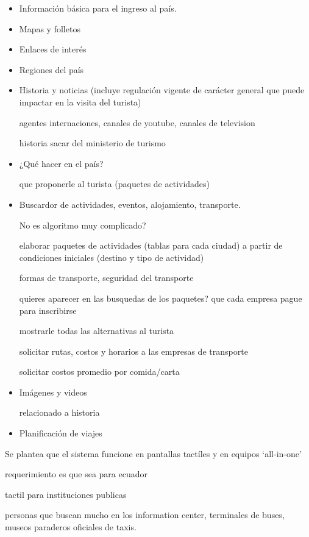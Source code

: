 \documentclass{article}
\begin{document}
\begin{itemize}
    \item{Información básica para el ingreso al país.}
    \item{Mapas y folletos}
    \item{Enlaces de interés}
    \item{Regiones del país}
    \item{Historia y noticias (incluye regulación vigente de carácter general
        que puede impactar en la visita del turista)

        agentes internaciones, canales de youtube, canales de television

        historia sacar del ministerio de turismo
        }
    \item{
            ¿Qué hacer en el país?

            que proponerle al turista (paquetes de actividades)
        }
    \item{
            Buscardor de actividades, eventos, alojamiento, transporte.

            No es algoritmo muy complicado?

            elaborar paquetes de actividades (tablas para cada ciudad)
            a partir de condiciones iniciales (destino y tipo de actividad)

            formas de transporte, seguridad del transporte

            quieres aparecer en las busquedas de los paquetes? que cada empresa
            pague para inscribirse

            mostrarle todas las alternativas al turista

            solicitar rutas, costos y horarios a las empresas de transporte

            solicitar costos promedio por comida/carta
        }
    \item{
            Imágenes y videos

            relacionado a historia
        }
    \item{Planificación de viajes}
\end{itemize}
Se plantea que el sistema funcione en pantallas tactíles y en equipos `all-in-one'

requerimiento es que sea para ecuador

tactil para instituciones publicas

personas que buscan mucho en los information center, terminales de buses, museos
paraderos oficiales de taxis.
\end{document}
